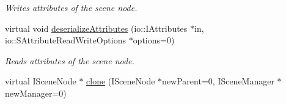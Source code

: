 \begin{DoxyCompactItemize}
\begin{DoxyCompactList}\small\item\em Writes attributes of the scene node. \end{DoxyCompactList}\item 
\hypertarget{classirr_1_1scene_1_1_c_light_scene_node_a490f611a8ddb5b6a1da559ec73561a0f}{virtual void \hyperlink{classirr_1_1scene_1_1_c_light_scene_node_a490f611a8ddb5b6a1da559ec73561a0f}{deserialize\-Attributes} (io\-::\-I\-Attributes $\ast$in, io\-::\-S\-Attribute\-Read\-Write\-Options $\ast$options=0)}\label{classirr_1_1scene_1_1_c_light_scene_node_a490f611a8ddb5b6a1da559ec73561a0f}

\begin{DoxyCompactList}\small\item\em Reads attributes of the scene node. \end{DoxyCompactList}\item 
\hypertarget{classirr_1_1scene_1_1_c_light_scene_node_a4bfe8692d4f3308ce97c62ff5114ba67}{virtual I\-Scene\-Node $\ast$ \hyperlink{classirr_1_1scene_1_1_c_light_scene_node_a4bfe8692d4f3308ce97c62ff5114ba67}{clone} (I\-Scene\-Node $\ast$new\-Parent=0, I\-Scene\-Manager $\ast$new\-Manager=0)}\label{classirr_1_1scene_1_1_c_light_scene_node_a4bfe8692d4f3308ce97c62ff5114ba67}


\end{DoxyCompactItemize}
